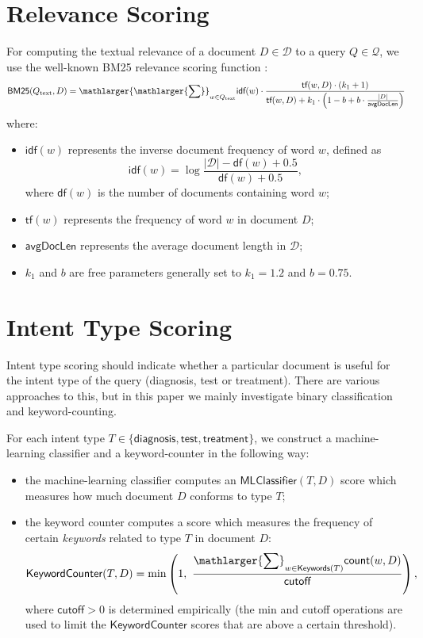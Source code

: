 \section{Relevance Scoring}
For computing the textual relevance of a document $D\in\mathcal{D}$ to a query $Q\in\mathcal{Q}$,
we use the well-known BM25 relevance scoring function \cite{bm25}:
\begin{equation}\label{bm25-formula}
\textsf{BM25}(Q_{\text{text}},D)
 = \displaystyle\mathlarger{\mathlarger{\sum}}_{w\in Q_{\text{text}}} \textsf{idf}(w)\cdot\displaystyle\frac{\textsf{tf}(w,D)\cdot(k_1+1)}{\textsf{tf}(w,D)+k_1\cdot\left(1-b+b\cdot\frac{|D|}{\textsf{avgDocLen}}\right)}
\end{equation}
where:
\begin{itemize}
 \item $\textsf{idf}(w)$ represents the inverse document frequency of word $w$, defined as
\[\textsf{idf}(w) = \log \displaystyle\frac{|\mathcal{D}|-\textsf{df}(w)+0.5}{\textsf{df}(w)+0.5},\]
where $\textsf{df}(w)$ is the number of documents containing word $w$;
\item $\textsf{tf}(w)$ represents the frequency of word $w$ in document $D$;
\item $\textsf{avgDocLen}$ represents the average document length in $\mathcal{D}$;
\item $k_1$ and $b$ are free parameters generally set to $k_1=1.2$ and $b=0.75$.
\end{itemize}

\section{Intent Type Scoring}\label{intent-scoring}
Intent type scoring should indicate whether a particular document is useful for the intent type of the query
(diagnosis, test or treatment). There are various approaches to this, but in this paper we mainly investigate
binary classification and keyword-counting.

For each intent type $T\in\{\textsf{diagnosis}, \textsf{test}, \textsf{treatment}\}$,
we construct a machine-learning classifier and a keyword-counter in the following way:
\begin{itemize}
 \item the machine-learning classifier computes an $\textsf{MLClassifier}(T,D)$ score which measures how much document $D$ conforms to type $T$;
 \item the keyword counter computes a score which measures the frequency of certain \emph{keywords} related to type $T$ in document $D$:
 \begin{equation}\label{basic-formula}
  \textsf{KeywordCounter}(T,D) = \min\left(1,\,\, \displaystyle\frac{\displaystyle\mathlarger{\sum}_{w\in \textsf{Keywords}(T)} \textsf{count}(w,D)}{\textsf{cutoff}}\right),
 \end{equation}
  where $\textsf{cutoff} > 0$ is determined empirically (the \textsf{min} and \textsf{cutoff} operations are used to
  limit the $\textsf{KeywordCounter}$ scores that are above a certain threshold).
\end{itemize}

